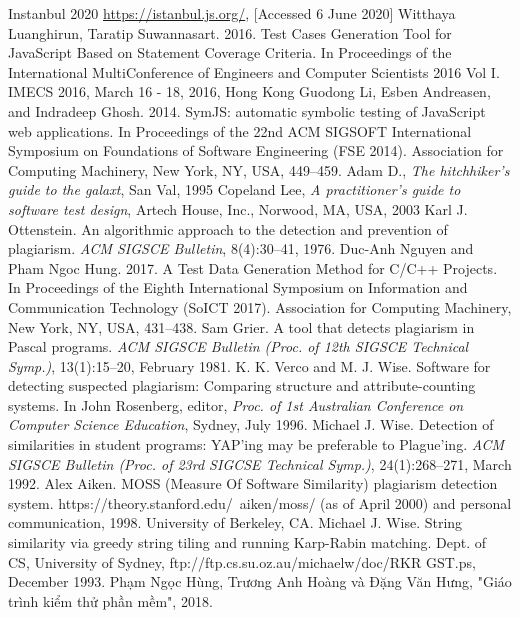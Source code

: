 \begin{thebibliography}{99}
Instanbul 2020
\url{https://istanbul.js.org/}, [Accessed 6 June 2020]
Witthaya Luanghirun, Taratip Suwannasart. 2016. Test Cases Generation Tool for JavaScript Based on Statement Coverage Criteria. In Proceedings of the International MultiConference of Engineers and Computer Scientists 2016 Vol I. IMECS 2016, March 16 - 18, 2016, Hong Kong
Guodong Li, Esben Andreasen, and Indradeep Ghosh. 2014. SymJS: automatic symbolic testing of JavaScript web applications. In Proceedings of the 22nd ACM SIGSOFT International Symposium on Foundations of Software Engineering (FSE 2014). Association for Computing Machinery, New York, NY, USA, 449–459.
Adam D., \textit{The hitchhiker's guide to the galaxt}, San Val, 1995
Copeland Lee, \textit{A practitioner's guide to software test design}, Artech House, Inc., Norwood, MA, USA, 2003
Karl J. Ottenstein. An algorithmic approach to the detection and prevention of plagiarism. \textit{ACM SIGSCE
Bulletin}, 8(4):30–41, 1976.
Duc-Anh Nguyen and Pham Ngoc Hung. 2017. A Test Data Generation Method for C/C++ Projects. In Proceedings of the Eighth International Symposium on Information and Communication Technology (SoICT 2017). Association for Computing Machinery, New York, NY, USA, 431–438.
Sam Grier. A tool that detects plagiarism in Pascal programs. \textit{ACM SIGSCE Bulletin (Proc. of 12th
SIGSCE Technical Symp.)}, 13(1):15–20, February 1981.
K. K. Verco and M. J. Wise. Software for detecting suspected plagiarism: Comparing structure and
attribute-counting systems. In John Rosenberg, editor, \textit{Proc. of 1st Australian Conference on Computer
Science Education}, Sydney, July 1996.
Michael J. Wise. Detection of similarities in student programs: YAP’ing may be preferable to Plague’ing.
\textit{ACM SIGSCE Bulletin (Proc. of 23rd SIGCSE Technical Symp.)}, 24(1):268–271, March 1992.
 Alex Aiken. MOSS (Measure Of Software Similarity) plagiarism detection system.
https://theory.stanford.edu/~aiken/moss/ (as of April 2000) and personal communication, 1998. University of Berkeley, CA.
Michael J. Wise. String similarity via greedy string tiling and running Karp-Rabin matching. Dept. of
CS, University of Sydney, ftp://ftp.cs.su.oz.au/michaelw/doc/RKR GST.ps, December 1993.
Phạm Ngọc Hùng, Trương Anh Hoàng và Đặng Văn Hưng, "Giáo trình kiểm thử phần mềm", 2018.
\end{thebibliography}